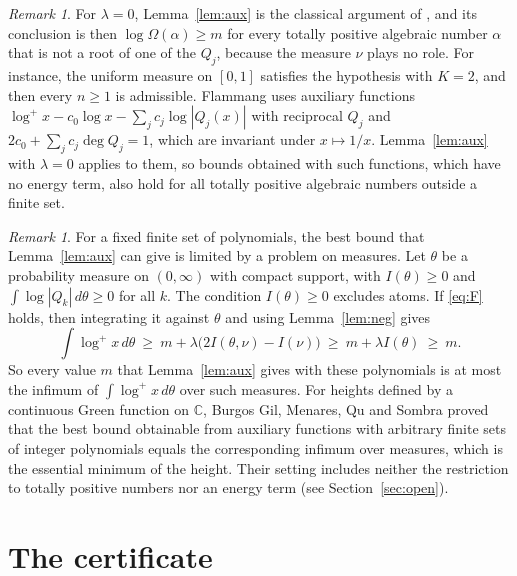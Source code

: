 \documentclass[11pt]{amsart}
\theoremstyle{remark}
\newtheorem{remark}[theorem]{Remark}
\numberwithin{equation}{section}
\newcommand{\C}{\mathbb{C}}
\newcommand{\logp}{\log^{+}}
\begin{document}
\begin{remark}\label{rem:flammang}
For $\lambda=0$, Lemma~\ref{lem:aux} is the classical argument of \cite{Smy81}, and its conclusion is then $\log\Omega(\alpha)\ge m$ for every totally positive algebraic number $\alpha$ that is not a root of one of the $Q_j$, because the measure $\nu$ plays no role. For instance, the uniform measure on $[0,1]$ satisfies the hypothesis with $K=2$, and then every $n\ge1$ is admissible. Flammang \cite[Section~2.1]{Fla15} uses auxiliary functions $\logp x-c_0\log x-\sum_jc_j\log|Q_j(x)|$ with reciprocal $Q_j$ and $2c_0+\sum_jc_j\deg Q_j=1$, which are invariant under $x\mapsto1/x$. Lemma~\ref{lem:aux} with $\lambda=0$ applies to them, so bounds obtained with such functions, which have no energy term, also hold for all totally positive algebraic numbers outside a finite set.
\end{remark}

\begin{remark}\label{rem:dual}
For a fixed finite set of polynomials, the best bound that Lemma~\ref{lem:aux} can give is limited by a problem on measures. Let $\theta$ be a probability measure on $(0,\infty)$ with compact support, with $I(\theta)\ge0$ and $\int\log|Q_k|\,d\theta\ge0$ for all $k$. The condition $I(\theta)\ge0$ excludes atoms. If \eqref{eq:F} holds, then integrating it against $\theta$ and using Lemma~\ref{lem:neg} gives
\[
\int\logp x\,d\theta\ \ge\ m+\lambda\bigl(2I(\theta,\nu)-I(\nu)\bigr)\ \ge\ m+\lambda I(\theta)\ \ge\ m.
\]
So every value $m$ that Lemma~\ref{lem:aux} gives with these polynomials is at most the infimum of $\int\logp x\,d\theta$ over such measures. For heights defined by a continuous Green function on $\C$, Burgos Gil, Menares, Qu and Sombra \cite[Theorem~D]{BMQS26} proved that the best bound obtainable from auxiliary functions with arbitrary finite sets of integer polynomials equals the corresponding infimum over measures, which is the essential minimum of the height. Their setting includes neither the restriction to totally positive numbers nor an energy term (see Section~\ref{sec:open}).
\end{remark}

\section{The certificate}\label{sec:cert}
\end{document}
